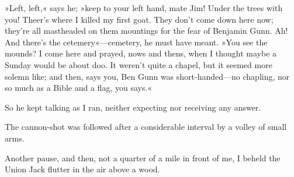 »Left, left,« says he; »keep to your left hand, mate Jim! Under the trees with you! Theer's where I killed my first goat. They don't come down here now; they're all mastheaded on them mountings for the fear of Benjamin Gunn. Ah! And there's the cetemery«—cemetery, he must have meant. »You see the mounds? I come here and prayed, nows and thens, when I thought maybe a Sunday would be about doo. It weren't quite a chapel, but it seemed more solemn like; and then, says you, Ben Gunn was short-handed—no chapling, nor so much as a Bible and a flag, you says.«

So he kept talking as I ran, neither expecting nor receiving any answer.

The cannon-shot was followed after a considerable interval by a volley of small arms.

Another pause, and then, not a quarter of a mile in front of me, I beheld the Union Jack flutter in the air above a wood.